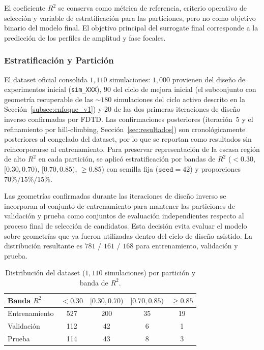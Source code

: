 El coeficiente $R^2$ se conserva como métrica de referencia, criterio operativo de selección y variable de estratificación para las particiones, pero no como objetivo binario del modelo final. El objetivo principal del surrogate final corresponde a la predicción de los perfiles de amplitud y fase focales.

\subsubsection{Estratificación y Partición}

El dataset oficial consolida $1{,}110$ simulaciones: $1{,}000$ provienen del diseño de experimentos inicial (\texttt{sim\_XXX}), $90$ del ciclo de mejora inicial (el subconjunto con geometría recuperable de las ${\sim}180$ simulaciones del ciclo activo descrito en la Sección~\ref{subsec:enfoque_v1}) y $20$ de las dos primeras iteraciones de diseño inverso confirmadas por FDTD. Las confirmaciones posteriores (iteración~5 y el refinamiento por hill-climbing, Sección~\ref{sec:resultados}) son cronológicamente posteriores al congelado del dataset, por lo que se reportan como resultados sin reincorporarse al entrenamiento. Para preservar representación de la escasa región de alto $R^2$ en cada partición, se aplicó estratificación por bandas de $R^2$ ($<0.30$, $[0.30,0.70)$, $[0.70,0.85)$, $\geq 0.85$) con semilla fija ($\texttt{seed}=42$) y proporciones $70\%/15\%/15\%$.

Las geometrías confirmadas durante las iteraciones de diseño inverso se incorporan al conjunto de entrenamiento para mantener las particiones de validación y prueba como conjuntos de evaluación independientes respecto al proceso final de selección de candidatos. Esta decisión evita evaluar el modelo sobre geometrías que ya fueron utilizadas dentro del ciclo de diseño asistido. La distribución resultante es $781$ / $161$ / $168$ para entrenamiento, validación y prueba.

\begin{table}[H]
\centering
\small
\begin{tabular}{lcccc}
\toprule
\textbf{Banda $R^2$} & \textbf{$<0.30$} & \textbf{$[0.30,0.70)$} & \textbf{$[0.70,0.85)$} & \textbf{$\geq 0.85$} \\
\midrule
Entrenamiento & 527 & 200 & 35 & 19 \\
Validación & 112 & 42 & 6 & 1 \\
Prueba & 114 & 43 & 8 & 3 \\
\bottomrule
\end{tabular}
\caption{Distribución del dataset ($1{,}110$ simulaciones) por partición y banda de $R^2$.}
\label{tab:particion}
\end{table}
